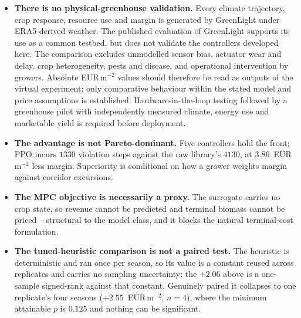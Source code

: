 \begin{itemize}

\item \textbf{There is no physical-greenhouse validation.} Every climate trajectory,
crop response, resource use and margin is generated by GreenLight under ERA5-derived
weather. The published evaluation of GreenLight supports its use as a common testbed, but
does not validate the controllers developed here. The comparison excludes unmodelled
sensor bias, actuator wear and delay, crop heterogeneity, pests and disease, and operational
intervention by growers. Absolute EUR\,m$^{-2}$ values should therefore be read as outputs
of the virtual experiment; only comparative behaviour within the stated model and price
assumptions is established. Hardware-in-the-loop testing followed by a greenhouse pilot
with independently measured climate, energy use and marketable yield is required before
deployment.

\item \textbf{The advantage is not Pareto-dominant.} Five controllers hold the
front; PPO incurs $1330$ violation steps against the raw library's $4130$, at
$3.86$~EUR\,m$^{-2}$ less margin. Superiority is conditional on how a grower
weights margin against corridor excursions.

\item \textbf{The MPC objective is necessarily a proxy.} The surrogate carries
no crop state, so revenue cannot be predicted and terminal biomass cannot be
priced -- structural to the model class, and it blocks the natural terminal-cost
formulation.

\item \textbf{The tuned-heuristic comparison is not a paired test.} The
heuristic is deterministic and ran once per season, so its value is a constant
reused across replicates and carries no sampling uncertainty: the $+2.06$ above
is a one-sample signed-rank against that constant. Genuinely paired it collapses
to one replicate's four seasons ($+2.55$~EUR\,m$^{-2}$, $n=4$), where the
minimum attainable $p$ is $0.125$ and nothing can be significant.


\end{itemize}
